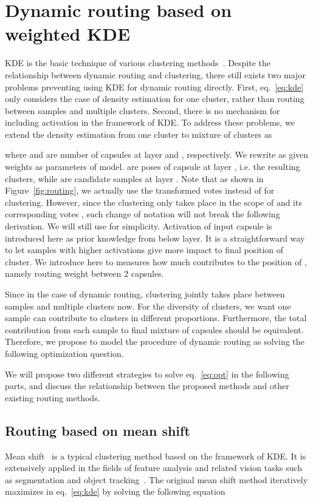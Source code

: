 \documentclass[runningheads]{llncs}
\begin{document}
\section{Dynamic routing based on weighted KDE}

KDE is the basic technique of various clustering methods~\cite{schwander2013learning}. Despite the relationship between dynamic routing and clustering, there still exists two major problems preventing using KDE for dynamic routing directly. First, eq.~\ref{eq:kde} only considers the case of density estimation for one cluster, rather than routing between samples and multiple clusters. Second, there is no mechanism for including activation in the framework of KDE. To address these problems, we extend the density estimation from one cluster to mixture of clusters as

where  and  are number of capsules at layer  and , respectively. We rewrite  as  given weights  as parameters of model.  are poses of capsule at layer , i.e. the resulting clusters, while  are candidate samples at layer . Note that as shown in Figure~\ref{fig:routing}, we actually use the transformed votes  instead of  for clustering. However, since the clustering only takes place in the scope of  and its corresponding votes , such change of notation will not break the following derivation. We will still use  for simplicity. Activation  of input capsule is introduced here as prior knowledge from below layer. It is a straightforward way to let samples with higher activations give more impact to final position of cluster. We introduce  here to measures how much  contributes to the position of , namely routing weight between 2 capsules. 

Since in the case of dynamic routing, clustering jointly takes place between samples and multiple clusters now. For the diversity of clusters, we want one sample can contribute to clusters in different proportions. Furthermore, the total contribution from each sample to final mixture of capsules should be equivalent. Therefore, we propose to model the procedure of dynamic routing as solving the following optimization question.

We will propose two different strategies to solve eq.~\ref{eq:opt} in the following parts, and discuss the relationship between the proposed methods and other existing routing methods.

\subsection{Routing based on mean shift}
Mean shift~\cite{comaniciu2002mean} is a typical clustering method based on the framework of KDE. It is extensively applied in the fields of feature analysis and related vision tasks such as segmentation and object tracking~\cite{meanshift}. The original mean shift method iteratively maximizes  in eq.~\ref{eq:kde} by solving the following equation
\end{document}
